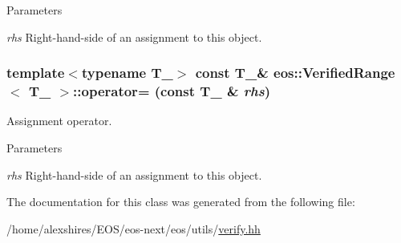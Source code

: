 \begin{DoxyParams}{Parameters}
\item[{\em rhs}]Right-\/hand-\/side of an assignment to this object. \end{DoxyParams}
\hypertarget{classeos_1_1VerifiedRange_af7df09e39360f49d269afffd8a2634be}{
\subsubsection[{operator=}]{\setlength{\rightskip}{0pt plus 5cm}template$<$typename T\_\-$>$ const T\_\-\& {\bf eos::VerifiedRange}$<$ T\_\- $>$::operator= (const T\_\- \& {\em rhs})}}
\label{classeos_1_1VerifiedRange_af7df09e39360f49d269afffd8a2634be}
Assignment operator.


\begin{DoxyParams}{Parameters}
\item[{\em rhs}]Right-\/hand-\/side of an assignment to this object. \end{DoxyParams}


The documentation for this class was generated from the following file:\begin{DoxyCompactItemize}
\item 
/home/alexshires/EOS/eos-\/next/eos/utils/\hyperlink{verify_8hh}{verify.hh}\end{DoxyCompactItemize}

